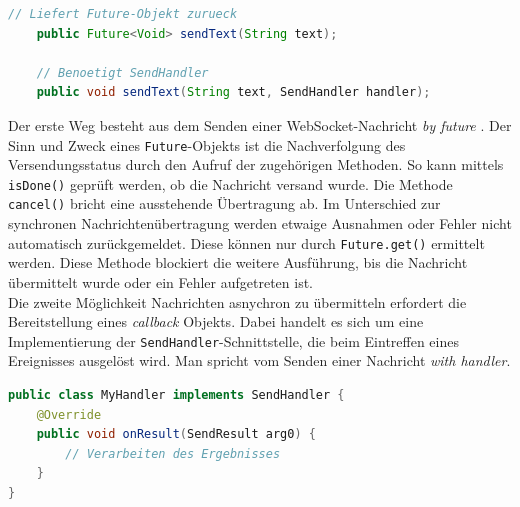 \documentclass[11pt,a4paper,titlepage]{scrartcl}
\numberwithin{equation}{section}
\begin{document}
\begin{lstlisting}[frame=single, language=Java, caption=Java: Future und Handler]
	// Liefert Future-Objekt zurueck
	public Future<Void> sendText(String text);
	
	// Benoetigt SendHandler
	public void sendText(String text, SendHandler handler);

\end{lstlisting}

\noindent Der erste Weg besteht aus dem Senden einer WebSocket-Nachricht \textit{by future} \autocite[119]{coward_java_2014}. Der Sinn und Zweck eines \texttt{Future}-Objekts ist die Nachverfolgung des Versendungsstatus durch den Aufruf der zugehörigen Methoden. So kann mittels \texttt{isDone()} geprüft werden, ob die Nachricht versand wurde. Die Methode \texttt{cancel()} bricht eine ausstehende Übertragung ab. Im Unterschied zur synchronen Nachrichtenübertragung werden etwaige Ausnahmen oder Fehler nicht automatisch zurückgemeldet. Diese können nur durch 
\texttt{Future.get()} ermittelt werden. Diese Methode blockiert die weitere Ausführung, bis die Nachricht übermittelt wurde oder ein Fehler aufgetreten ist. \\

\noindent Die zweite Möglichkeit Nachrichten asnychron zu übermitteln erfordert die Bereitstellung eines \textit{callback} Objekts. Dabei handelt es sich um eine Implementierung der \texttt{SendHandler}-Schnittstelle, die beim Eintreffen eines Ereignisses ausgelöst wird. Man spricht vom Senden einer Nachricht \textit{with handler}.\smallskip

\begin{lstlisting}[frame=single, language=Java, caption=Java: Callback Interface SendHandler]
public class MyHandler implements SendHandler {
	@Override
	public void onResult(SendResult arg0) {
		// Verarbeiten des Ergebnisses
	}
}
\end{lstlisting}
\end{document}
